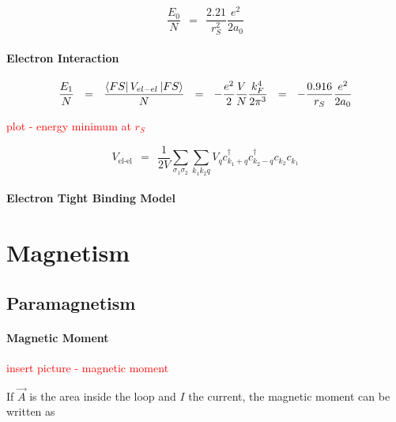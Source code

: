 \documentclass[10pt]{report}
\numberwithin{equation}{chapter}
\begin{document}
\begin{equation*}
\frac{E_0}{N} ~~ = ~~ \frac{2.21}{r_S^2} \frac{e^2}{2a_0}
\end{equation*}



\subsubsection*{Electron Interaction}

\begin{equation*}
  \frac{E_1}{N} ~~ = ~~ \frac{\bra{FS} V_{el-el} \ket{FS}}{N} ~~ = ~~ 
  - \frac{e^2}{2} \frac{V}{N} \frac{k_F^4}{2 \pi^3} ~~=~~ - \frac{0.916}{r_S} \frac{e^2}{2 a_0}
\end{equation*}


\textcolor{red}{plot - energy minimum at $r_S$}


\begin{equation}
  V_\text{el-el} ~~=~~ \frac{1}{2V} \sum_{\sigma_1 \sigma_2} \sum_{k_1 k_2 q} 
    V_q c_{k_1+q}^\dag c_{k_2-q}^\dag c_{k_2} c_{k_1}
\end{equation}


\subsubsection{Electron Tight Binding Model}






\chapter{Magnetism}

\section{Paramagnetism}

\subsubsection{Magnetic Moment}

\textcolor{red}{insert picture - magnetic moment}

If $\vec{A}$ is the area inside the loop and $I$ the current, the magnetic moment can be written as
\end{document}
